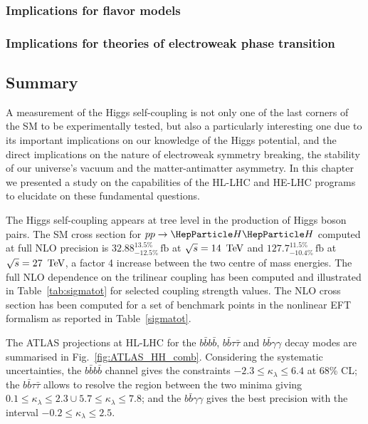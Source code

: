 \documentclass[../report.tex]{subfiles}
\providecommand{\main}{..}
\begin{document}
\subsubsection{Implications for flavor models}



\subsubsection{Implications for theories of electroweak phase transition}
\label{sec:HH_EWPT}




\subsection{Summary}

A measurement of the Higgs self-coupling is not only one of the last corners of the SM to be experimentally tested, but also a particularly interesting one due to its important implications on our knowledge of the Higgs potential, and the direct implications on the nature of electroweak symmetry breaking, the stability of our universe's vacuum and the matter-antimatter asymmetry. In this chapter we presented a study on the capabilities of the HL-LHC and HE-LHC programs to elucidate on these fundamental questions.

The Higgs self-coupling appears at tree level in the production of Higgs boson pairs. The SM cross section for $pp\to \HH$ computed at full NLO precision is $32.88^{13.5\%}_{-12.5\%}\,\text{fb}$ at $\sqrt{s}=14\,\text{\ensuremath{~\text{TeV}}}$ and $127.7^{11.5\%}_{-10.4\%}\,\text{fb}$ at $\sqrt{s}=27\,\text{\ensuremath{~\text{TeV}}}$, a factor 4 increase between the two centre of mass energies. The full NLO dependence on the trilinear coupling has been computed and illustrated in Table~\ref{tab:sigmatot} for selected coupling strength values. The NLO cross section has been computed for a set of benchmark points in the nonlinear EFT formalism as reported in Table~\ref{sigmatot}.

The ATLAS projections at HL-LHC for the $b\bar{b}b\bar{b}$, $b\bar{b}\tau\bar{\tau}$ and $b\bar{b}\gamma\gamma$ decay modes are summarised in Fig.~\ref{fig:ATLAS_HH_comb}. Considering the systematic uncertainties, the $b\bar{b}b\bar{b}$ channel gives the constraints $-2.3\leq \kappa_\lambda \leq 6.4$ at 68\% CL; the  $b\bar{b}\tau\bar{\tau}$ allows to resolve the region between the two minima giving $0.1\leq \kappa_\lambda\leq 2.3 \cup 5.7\leq \kappa_\lambda \leq 7.8$; and the $b\bar{b}\gamma\gamma$ gives the best precision with the interval $-0.2 \leq \kappa_\lambda \leq 2.5$.
\end{document}
